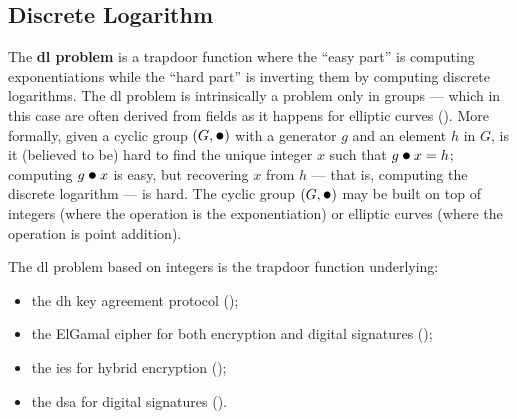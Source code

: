 \subsection{Discrete Logarithm}\label{sec:trapdoor_functions:discrete_logarithm}

The \textbf{\gls{dl} problem} is a trapdoor function where the ``easy part'' is computing exponentiations while the ``hard part'' is inverting them by computing discrete logarithms. The \gls{dl} problem is intrinsically a problem only in groups --- which in this case are often derived from fields as it happens for elliptic curves (). More formally, given a cyclic group $(G, \bigcdot)$ with a generator $g$ and an element $h$ in $G$, is it (believed to be) hard to find the unique integer $x$ such that $g \bigcdot x = h$; computing $g \bigcdot x$ is easy, but recovering $x$ from $h$ --- that is, computing the discrete logarithm --- is hard. The cyclic group $(G, \bigcdot)$ may be built on top of integers (where the operation is the exponentiation) or elliptic curves (where the operation is point addition).

The \gls{dl} problem based on integers is the trapdoor function underlying:
\begin{itemize}
	\item the \gls{dh} key agreement protocol ();
	\item the ElGamal cipher for both encryption and digital signatures ();
	\item the \gls{ies} for hybrid encryption ();	
	\item the \gls{dsa} for digital signatures ().
\end{itemize}




